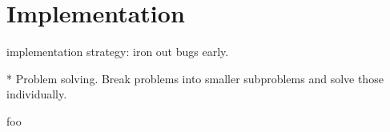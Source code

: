 
%
%
%
%
%
%





\section{Implementation}
\label{sec:implementation}


implementation strategy: iron out bugs early.

* Problem solving. Break problems into smaller subproblems and solve those individually.

foo








